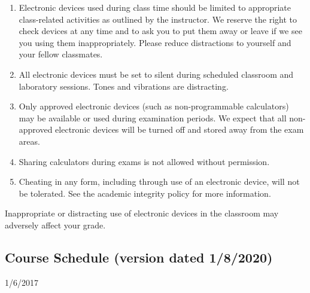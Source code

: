\documentclass{tufte-handout}
\begin{document}
\begin{fullwidth}
\begin{enumerate}
\item Electronic devices used during class time should be limited to appropriate class-related activities as outlined by the instructor. We reserve the right to check devices at any time and to ask you to put them away or leave if we see you using them inappropriately. Please reduce distractions to yourself and your fellow classmates.
\item All electronic devices must be set to silent during scheduled classroom and laboratory sessions. Tones and vibrations are distracting.
\item Only approved electronic devices (such as non-programmable calculators) may be available or used during examination periods. We expect that all non-approved electronic devices will be turned off and stored away from the exam areas.
\item Sharing calculators during exams is not allowed without permission. 
\item Cheating in any form, including through use of an electronic device, will not be tolerated. See the academic integrity policy for more information.
\end{enumerate}

Inappropriate or distracting use of electronic devices in the classroom may adversely affect your  grade. 








\newpage
\subsection{Course Schedule (version dated 1/8/2020)}
%


  \setlength{\calwidth}{6.5in}
  \setlength{\calboxdepth}{0.3in}
  \begin{calendar}{1/6/20}{17}

 \skipday%
  \calday[Tuesday]{\classday} %
 \skipday%
  \calday[Thursday]{\classday} %
 \skipday%
    \skipday
    \skipday %








\end{calendar}
\end{fullwidth}
\end{document}
